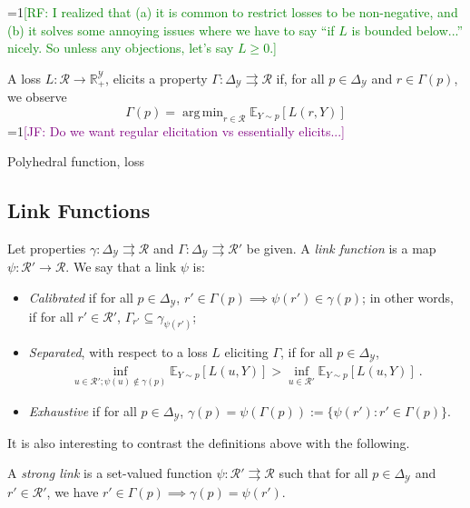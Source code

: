 \documentclass[anon,12pt]{colt2019}
\newcommand{\Comments}{1}
\newcommand{\mynote}[2]{\ifnum\Comments=1\textcolor{#1}{#2}\fi}
\newcommand{\raf}[1]{\mynote{green}{[RF: #1]}}
\newcommand{\jessie}[1]{\mynote{purple}{[JF: #1]}}
\newcommand{\reals}{\mathbb{R}}
\newcommand{\simplex}{\Delta_\Y}
\newcommand{\E}{\mathbb{E}}
\newcommand{\R}{\mathcal{R}}
\newcommand{\Y}{\mathcal{Y}}
\newcommand{\toto}{\rightrightarrows}
\DeclareMathOperator*{\argmin}{arg\,min}
\begin{document}
\begin{definition}
  \raf{I realized that (a) it is common to restrict losses to be non-negative, and (b) it solves some annoying issues where we have to say ``if $L$ is bounded below...'' nicely.  So unless any objections, let's say $L \geq 0$.}
  
  A loss $L:\R\to\reals^\Y_+$, elicits a property $\Gamma:\simplex \toto \R$ if, for all $p \in \simplex$ and $r \in \Gamma(p)$, we observe
  \begin{equation}
  \Gamma(p) = \argmin_{r \in \R} \E_{Y\sim p}[L(r,Y)]
  \end{equation}
  \jessie{Do we want regular elicitation vs essentially elicits...}
\end{definition}

\begin{definition}
  Polyhedral function, loss
\end{definition}

\subsection{Link Functions}

\begin{definition}
  Let properties $\gamma:\simplex\toto\R$ and $\Gamma:\simplex\toto\R'$ be given.
  A \emph{link function} is a map $\psi:\R'\to\R$.
  We say that a link $\psi$ is:
  \begin{itemize}
  \item \emph{Calibrated} if for all $p\in\simplex$, $r'\in \Gamma(p) \implies \psi(r') \in \gamma(p)$; in other words, if for all $r'\in\R'$, $\Gamma_{r'} \subseteq \gamma_{\psi(r')}$;
  \item \emph{Separated}, with respect to a loss $L$ eliciting $\Gamma$, if for all $p \in \simplex$,
  \begin{align*}
  \inf_{u \in \R'; \psi(u) \not \in \gamma(p)} \E_{Y\sim p}[L(u, Y)] > \inf_{u \in \R'}\E_{Y\sim p}[L(u, Y)]~.
  \end{align*}
  \item \emph{Exhaustive} if for all $p\in\simplex$, $\gamma(p) = \psi(\Gamma(p)) := \{\psi(r') : r'\in\Gamma(p)\}$.
  \end{itemize}
\end{definition}

It is also interesting to contrast the definitions above with the following.
\begin{definition}
  A \emph{strong link} is a set-valued function $\psi:\R'\toto\R$ such that for all $p\in\simplex$ and $r'\in\R'$, we have $r'\in\Gamma(p) \implies \gamma(p) = \psi(r')$.
\end{definition}
\end{document}
